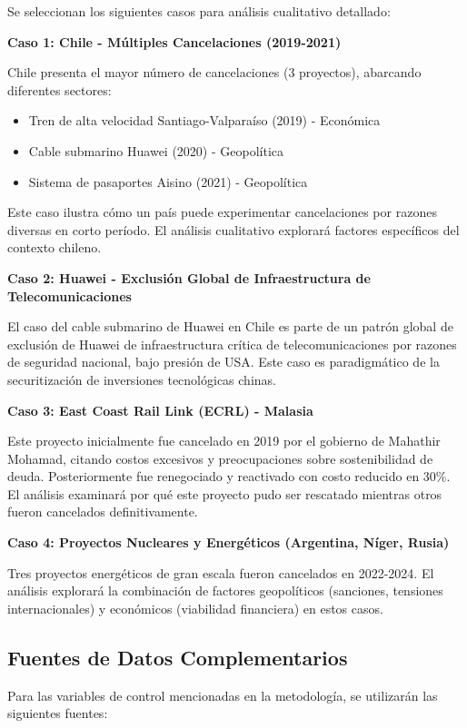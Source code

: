 \documentclass[12pt]{article}
\begin{document}
Se seleccionan los siguientes casos para análisis cualitativo detallado:

\textbf{Caso 1: Chile - Múltiples Cancelaciones (2019-2021)}

Chile presenta el mayor número de cancelaciones (3 proyectos), abarcando diferentes sectores:
\begin{itemize}
    \item Tren de alta velocidad Santiago-Valparaíso (2019) - Económica
    \item Cable submarino Huawei (2020) - Geopolítica
    \item Sistema de pasaportes Aisino (2021) - Geopolítica
\end{itemize}

Este caso ilustra cómo un país puede experimentar cancelaciones por razones diversas en corto período. El análisis cualitativo explorará factores específicos del contexto chileno.

\textbf{Caso 2: Huawei - Exclusión Global de Infraestructura de Telecomunicaciones}

El caso del cable submarino de Huawei en Chile es parte de un patrón global de exclusión de Huawei de infraestructura crítica de telecomunicaciones por razones de seguridad nacional, bajo presión de USA. Este caso es paradigmático de la securitización de inversiones tecnológicas chinas.

\textbf{Caso 3: East Coast Rail Link (ECRL) - Malasia}

Este proyecto inicialmente fue cancelado en 2019 por el gobierno de Mahathir Mohamad, citando costos excesivos y preocupaciones sobre sostenibilidad de deuda. Posteriormente fue renegociado y reactivado con costo reducido en 30\%. El análisis examinará por qué este proyecto pudo ser rescatado mientras otros fueron cancelados definitivamente.

\textbf{Caso 4: Proyectos Nucleares y Energéticos (Argentina, Níger, Rusia)}

Tres proyectos energéticos de gran escala fueron cancelados en 2022-2024. El análisis explorará la combinación de factores geopolíticos (sanciones, tensiones internacionales) y económicos (viabilidad financiera) en estos casos.

\subsection{Fuentes de Datos Complementarios}

Para las variables de control mencionadas en la metodología, se utilizarán las siguientes fuentes:
\end{document}
